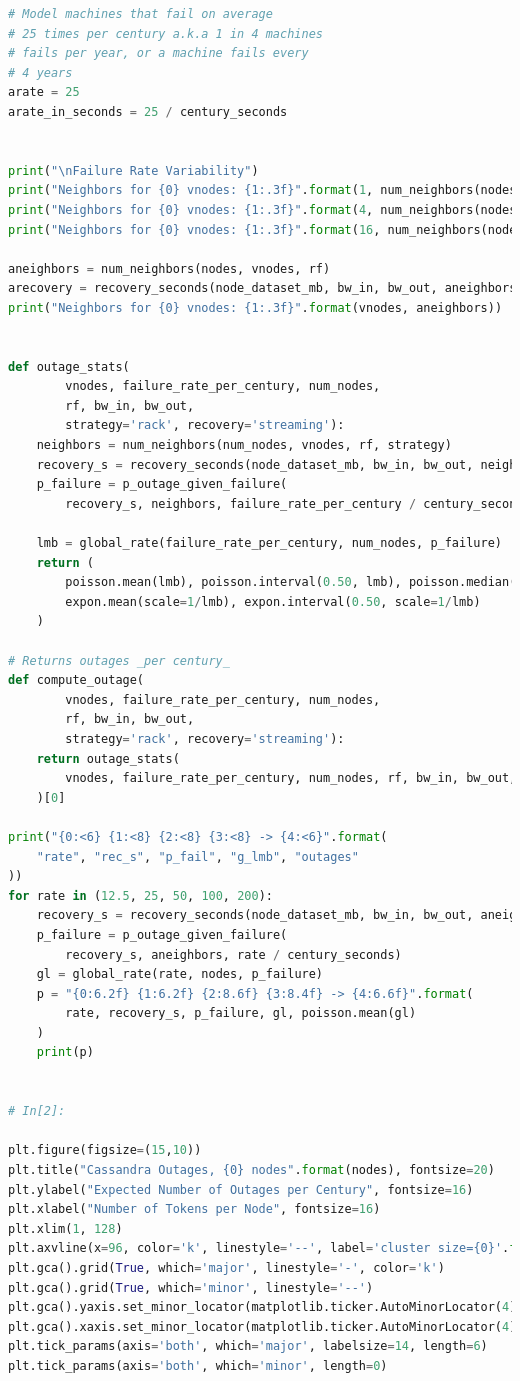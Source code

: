 \documentclass{article}
\begin{document}
\begin{lstlisting}[language=Python]
# Model machines that fail on average
# 25 times per century a.k.a 1 in 4 machines
# fails per year, or a machine fails every
# 4 years
arate = 25
arate_in_seconds = 25 / century_seconds


print("\nFailure Rate Variability")
print("Neighbors for {0} vnodes: {1:.3f}".format(1, num_neighbors(nodes, 1, rf)))
print("Neighbors for {0} vnodes: {1:.3f}".format(4, num_neighbors(nodes, 4, rf)))
print("Neighbors for {0} vnodes: {1:.3f}".format(16, num_neighbors(nodes, 16, rf)))

aneighbors = num_neighbors(nodes, vnodes, rf)
arecovery = recovery_seconds(node_dataset_mb, bw_in, bw_out, aneighbors)
print("Neighbors for {0} vnodes: {1:.3f}".format(vnodes, aneighbors))


def outage_stats(
        vnodes, failure_rate_per_century, num_nodes,
        rf, bw_in, bw_out,
        strategy='rack', recovery='streaming'):
    neighbors = num_neighbors(num_nodes, vnodes, rf, strategy)
    recovery_s = recovery_seconds(node_dataset_mb, bw_in, bw_out, neighbors, recovery)
    p_failure = p_outage_given_failure(
        recovery_s, neighbors, failure_rate_per_century / century_seconds)

    lmb = global_rate(failure_rate_per_century, num_nodes, p_failure)
    return (
        poisson.mean(lmb), poisson.interval(0.50, lmb), poisson.median(lmb),
        expon.mean(scale=1/lmb), expon.interval(0.50, scale=1/lmb)
    )

# Returns outages _per century_
def compute_outage(
        vnodes, failure_rate_per_century, num_nodes,
        rf, bw_in, bw_out,
        strategy='rack', recovery='streaming'):
    return outage_stats(
        vnodes, failure_rate_per_century, num_nodes, rf, bw_in, bw_out, strategy
    )[0]

print("{0:<6} {1:<8} {2:<8} {3:<8} -> {4:<6}".format(
    "rate", "rec_s", "p_fail", "g_lmb", "outages"
))
for rate in (12.5, 25, 50, 100, 200):
    recovery_s = recovery_seconds(node_dataset_mb, bw_in, bw_out, aneighbors)
    p_failure = p_outage_given_failure(
        recovery_s, aneighbors, rate / century_seconds)
    gl = global_rate(rate, nodes, p_failure)
    p = "{0:6.2f} {1:6.2f} {2:8.6f} {3:8.4f} -> {4:6.6f}".format(
        rate, recovery_s, p_failure, gl, poisson.mean(gl)
    )
    print(p)


# In[2]:

plt.figure(figsize=(15,10))
plt.title("Cassandra Outages, {0} nodes".format(nodes), fontsize=20)
plt.ylabel("Expected Number of Outages per Century", fontsize=16)
plt.xlabel("Number of Tokens per Node", fontsize=16)
plt.xlim(1, 128)
plt.axvline(x=96, color='k', linestyle='--', label='cluster size={0}'.format(nodes))
plt.gca().grid(True, which='major', linestyle='-', color='k')
plt.gca().grid(True, which='minor', linestyle='--')
plt.gca().yaxis.set_minor_locator(matplotlib.ticker.AutoMinorLocator(4))
plt.gca().xaxis.set_minor_locator(matplotlib.ticker.AutoMinorLocator(4))
plt.tick_params(axis='both', which='major', labelsize=14, length=6)
plt.tick_params(axis='both', which='minor', length=0)


\end{lstlisting}
\end{document}
